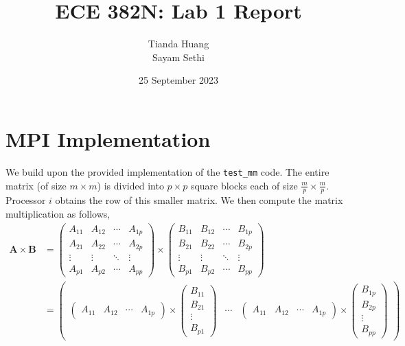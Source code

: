 \documentclass[11pt]{article}
\title{ECE 382N: Lab 1 Report}
\author{Tianda Huang\\Sayam Sethi}
\date{25 September 2023}
\begin{document}
\maketitle

\tableofcontents

\section{MPI Implementation}
We build upon the provided implementation of the \texttt{test\_mm} code. The entire matrix (of size $m\times m$) is divided into $p\times p$ square blocks each of size $\frac{m}{p}\times \frac{m}{p}$. Processor $i$ obtains the row of this smaller matrix. We then compute the matrix multiplication as follows,
\begin{equation}
    \begin{split}
    \mathbf{A} \times \mathbf{B} &= \begin{pmatrix}
        A_{11} & A_{12} & \cdots & A_{1p} \\
        A_{21} & A_{22} & \cdots & A_{2p} \\
        \vdots & \vdots & \ddots & \vdots \\
        A_{p1} & A_{p2} & \cdots & A_{pp}
    \end{pmatrix} \times \begin{pmatrix}
        B_{11} & B_{12} & \cdots & B_{1p} \\
        B_{21} & B_{22} & \cdots & B_{2p} \\
        \vdots & \vdots & \ddots & \vdots \\
        B_{p1} & B_{p2} & \cdots & B_{pp}
    \end{pmatrix}\\
    &= \begin{pmatrix}
        \begin{pmatrix}
            A_{11} & A_{12} & \cdots & A_{1p}
        \end{pmatrix} \times \begin{pmatrix}
            B_{11} \\ B_{21} \\ \vdots \\ B_{p1}
        \end{pmatrix} & \cdots & \begin{pmatrix}
            A_{11} & A_{12} & \cdots & A_{1p}
        \end{pmatrix} \times \begin{pmatrix}
            B_{1p} \\ B_{2p} \\ \vdots \\ B_{pp}

\end{pmatrix}
\end{pmatrix}
\end{split}
\end{equation}
\end{document}
